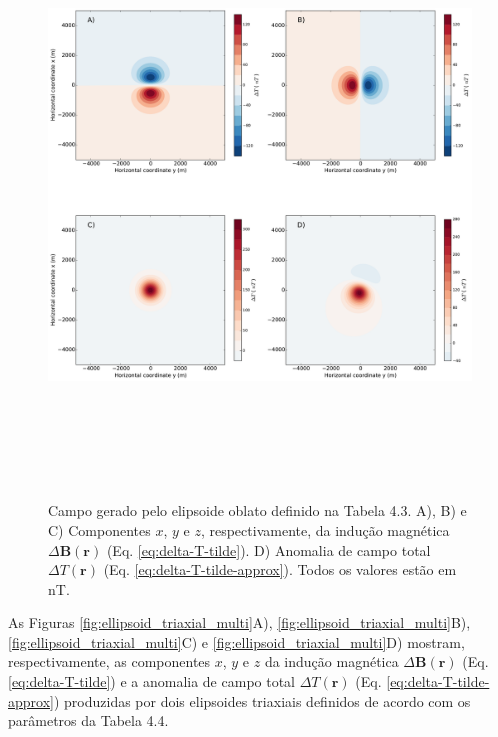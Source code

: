 \begin{figure}[hbt!]
	\centering \includegraphics[width=16cm,height=16cm]{figures/ellipsoid_oblate}
	\caption[Campo gerado pelo elipsoide oblato definido na Tabela 4.3. A), B) e C) Componentes $x$, $y$ e $z$, respectivamente, da indução magnética $\Delta \mathbf{B}(\mathbf{r})$ (Eq. \ref{eq:delta-T-tilde}). D) Anomalia de campo total $\Delta T (\mathbf{r})$ (Eq. \ref{eq:delta-T-tilde-approx}). Todos os valores estão em nT.]{Campo gerado pelo elipsoide oblato definido na Tabela 4.3. A), B) e C) Componentes $x$, $y$ e $z$, respectivamente, da indução magnética $\Delta \mathbf{B}(\mathbf{r})$ (Eq. \ref{eq:delta-T-tilde}). D) Anomalia de campo total $\Delta T (\mathbf{r})$ (Eq. \ref{eq:delta-T-tilde-approx}). Todos os valores estão em nT.}
	\label{fig:oblate}
\end{figure}

As Figuras \ref{fig:ellipsoid_triaxial_multi}A), \ref{fig:ellipsoid_triaxial_multi}B), \ref{fig:ellipsoid_triaxial_multi}C) e \ref{fig:ellipsoid_triaxial_multi}D) mostram, respectivamente, as componentes $x$, $y$ e $z$ da indução magnética $\Delta \mathbf{B}(\mathbf{r})$ (Eq. \ref{eq:delta-T-tilde}) e a
anomalia de campo total $\Delta T (\mathbf{r})$ (Eq. \ref{eq:delta-T-tilde-approx}) produzidas por dois elipsoides triaxiais definidos de acordo com os parâmetros da Tabela 4.4.


